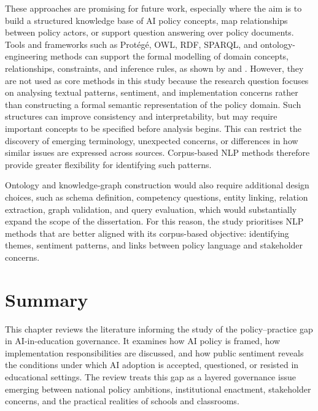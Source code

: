These approaches are promising for future work, especially where the aim is to build
a structured knowledge base of AI policy concepts, map relationships between policy
actors, or support question answering over policy documents. Tools and frameworks
such as Protégé, OWL, RDF, SPARQL, and ontology-engineering methods can support the
formal modelling of domain concepts, relationships, constraints, and inference rules,
as shown by \cite{musen2015protege} and \cite{horridge2011practical}. However, they
are not used as core methods in this study because the research question focuses on
analysing textual patterns, sentiment, and implementation concerns rather than
constructing a formal semantic representation of the policy domain. Such structures
can improve consistency and interpretability, but may require important concepts to
be specified before analysis begins. This can restrict the discovery of emerging
terminology, unexpected concerns, or differences in how similar issues are expressed
across sources. Corpus-based NLP methods therefore provide greater flexibility for
identifying such patterns.

Ontology and knowledge-graph construction would also require additional design
choices, such as schema definition, competency questions, entity linking, relation
extraction, graph validation, and query evaluation, which would substantially expand
the scope of the dissertation. For this reason, the study prioritises NLP methods
that are better aligned with its corpus-based objective: identifying themes,
sentiment patterns, and links between policy language and stakeholder concerns.

\section*{Summary}


This chapter reviews the literature informing the study of the policy--practice gap
in AI-in-education governance. It examines how AI policy is framed, how
implementation responsibilities are discussed, and how public sentiment reveals the
conditions under which AI adoption is accepted, questioned, or resisted in
educational settings. The review treats this gap as a layered governance issue
emerging between national policy ambitions, institutional enactment, stakeholder
concerns, and the practical realities of schools and classrooms.



